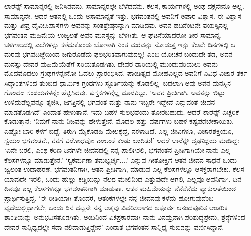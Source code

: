 ಲಾರೆನ್ಸ್ ಸಾಮಾನ್ಯರಲ್ಲಿ ಜನಿಸಿದವನು. ಸಾಮಾನ್ಯರಲ್ಲೇ ಬೆಳೆದವನು. ಕೆಲಸ, ಕಾರ್ಯಗಳಲ್ಲಿ ಅಂಥ ದಕ್ಷನೇನೂ ಅಲ್ಲ. ಸಾಮಾನ್ಯನೇ. ಆದರೆ ಆತನಲ್ಲಿ ಒಂದು ಅಸಾಮಾನ್ಯತೆ ಇತ್ತು. ಭಗವಂತನಲ್ಲಿ ಅವನಿಗೆ ಅಪಾರ ವಿಶ್ವಾಸ. ಈ ವಿಶ್ವಾಸ ಮತ್ತು ತೀವ್ರ ದೈವೀಪಿಪಾಸೆಗಳು ಅವನನ್ನು ಸಂತಶ್ರೇಷ್ಠನನ್ನಾಗಿ ಮಾಡಿದವು. ಅವನ ಹದಿನೆಂಟನೇ ವಯಸ್ಸಿನಲ್ಲಿ ಭಗವಂತನ ಮಹಿಮೆಯ ಉಜ್ವಲತೆ ಅವನ ಮನಸ್ಸನ್ನು ಬೆಳಗಿತು. ಆ ಘಟನೆಯಾದರೋ ತೀರ ಸಾಮಾನ್ಯ. ಚಳಿಗಾಲದಲ್ಲಿ ಎಲೆಗಳನ್ನು ಕಳೆದುಕೊಂಡು ಬೋಳಾಗಿ ನಿಂತ ಮರವನ್ನು ನೋಡುತ್ತ ಇನ್ನು ಕೆಲವೇ ದಿನಗಳಲ್ಲಿ ಆ ಮರವು ಭಗವದಿಚ್ಛೆಯಿಂದ ಚಿಗುರೊಡೆದು ಫಲಭರಿತವಾಗುವುದಲ್ಲ! ಎಂಬ ಯೋಚನೆ ಬಂದುದೇ ತಡ, ಅವನ ಮನಸ್ಸು ದೇವರ ಮಹಿಮೆಯೆಡೆಗೆ ಸರಿಯತೊಡಗಿತು. ದೇವರ ದಾರಿಯಲ್ಲಿ ಮುಂದುವರಿಯಲು ಅವನು ಮೊದಮೊದಲು ಗ್ರಂಥಗಳನ್ನೇನೋ ಓದಲು ಪ್ರಾರಂಭಿಸಿದ. ಪಾಂಡಿತ್ಯದ ಮೋಹವಿಲ್ಲದ ಅವನಿಗೆ ವಿವಿಧ ವಿಚಾರ ತರ್ಕ ಸಿದ್ಧಾಂತಗಳಿಂದ ತುಂಬಿದ ಧಾರ್ಮಿಕ ಗ್ರಂಥಗಳು ಸ್ಫೂರ್ತಿಯನ್ನು ಕೊಡಲಿಲ್ಲ. ಬದಲಾಗಿ ಅವು ಅವನ ಮನಸ್ಸಿನ ಗೊಂದಲ ಸಂಶಯಗಳನ್ನೇ ಹೆಚ್ಚಿಸಿದವು. ಪುಸ್ತಕಗಳನ್ನೆಲ್ಲ ದೂರವಿಟ್ಟು, ‘ಅವನ ಪ್ರೀತಿಗಾಗಿ, ಅವನನ್ನು ಬಿಟ್ಟು ಉಳಿದುದೆಲ್ಲವನ್ನೂ ತ್ಯಜಿಸಿ, ಜಗತ್ತಿನಲ್ಲಿ ಭಗವಂತ ಮತ್ತು ನಾನು ಇಬ್ಬರೇ ಇದ್ದೇವೆ ಎನ್ನುವಂತೆ ಜೀವನ ಮಾಡತೊಡಗಿದೆ’ ಎಂದಾತ ಹೇಳುತ್ತಾನೆ. ಇದು ಬಹಳ ಸುಲಭವೆಂದು ತೋರಬಹುದು. ಆದರೆ ಲಾರೆನ್ಸ್ ಎಚ್ಚರಿಕೆ ಕೊಡುತ್ತಾನೆ: ‘ನಿಮಗೆ ನಾನು ನಿಜವನ್ನು ಹೇಳುತ್ತೇನೆ. ಮೊದಲ ಹತ್ತು ವರ್ಷಗಳು ಬಹಳ ಕಷ್ಟಪಡಬೇಕಾಯಿತು. ಎಷ್ಟೋ ಬಾರಿ ಕೆಳಗೆ ಬಿದ್ದೆ. ತಿರುಗಿ ಮೈಕೊಡಹಿ ಮೇಲಕ್ಕೆದ್ದೆ, ನರಳಾಡಿದೆ. ಎಲ್ಲ ಜೀವಿಗಳೂ, ವಿಚಾರಶಕ್ತಿಯೂ, ಸ್ವಯಂ ಭಗವಂತನೇ, ನನಗೆ ವಿರೋಧವೋ ಎಂಬಂತೆ ಕಂಡು ಬಂದಿತು!’ ಆದರೆ ಲಾರೆನ್ಸ್ ದೃಢನಿಶ್ಚಯ ಮಾಡಿದ್ದ: ‘ಏನೇ ಬರಲಿ, ಎಂಥ ಕಠಿಣ ದಿನಗಳೇ ಜೀವನದಲ್ಲಿ ನನ್ನ ಪಾಲಿಗಿರಲಿ, ಭಗವಂತನ ಪ್ರೀತಿಗಾಗಿಯೇ ನಾನು ಎಲ್ಲ ಕೆಲಸಗಳನ್ನೂ ಮಾಡುತ್ತೇನೆ.’ ‘ಸ್ವಕರ್ಮಣಾ ತಮಭ್ಯರ್ಚ್ಯ....’ ಎನ್ನುವ ಗೀತೋಕ್ತಿಗೆ ಆತನ ಜೀವನ-ಸಾಧನೆ ಒಂದು ಜ್ವಲಂತ ಉದಾಹರಣೆ. ಭಗವಂತನಿಗಾಗಿ, ಆತನ ಪ್ರೀತಿಗಾಗಿ, ಮಾಡುವ ಎಲ್ಲ ಕೆಲಸಗಳಲ್ಲೂ ಆಸಕ್ತರಾಗಬೇಕು. ಕೆಲಸ ಯಾವುದೇ ಇರಲಿ, ಒಂದು ಹುಲ್ಲು ಕಡ್ಡಿಯನ್ನು ನೆಲದ ಮೇಲಿನಿಂದ ಎತ್ತುವುದೇ ಆಗಲಿ, ಎಲ್ಲವೂ ಅವನಿಗಾಗಿ. ದಿನ ದಿನವೂ ಎಲ್ಲ ಕೆಲಸಗಳನ್ನೂ ಭಗವಂತನಿಗಾಗಿ ಮಾಡುತ್ತಾ, ಆತನ ಮಹಿಮೆಯನ್ನು ನೆನೆನೆನೆದು ವ್ಯಾಕುಲತೆಯಿಂದ ಪ್ರಾರ್ಥಿಸುತ್ತಿದ್ದ. ‘ಈ ರೀತಿಯಾಗಿ ತೊಂದರೆ, ಆತಂಕಗಳಲ್ಲೇ ನನ್ನ ಜೀವನವು ಕಳೆದು ಹೋಗುವುದೆಂಬ ವ್ಯಥೆಯಲ್ಲಿದ್ದಾಗಲೇ, ಒಂದು ದಿನ ಥಟ್ಟನೇ ನನ್ನ ಆತ್ಮವು ವಿವರಿಸಲಾಗದ ಅಪೂರ್ವ ಆನಂದಪೂರಿತ ಆಂತರಿಕ ಶಾಂತಿಯನ್ನು ಅನುಭವಿಸತೊಡಗಿತು. ಅಂದಿನಿಂದ ಏಕಪ್ರಕಾರವಾಗಿ ನಾನು ವಿನಮ್ರನಾಗಿ ಪರಿಶುದ್ಧಪ್ರೇಮ, ಶ್ರದ್ಧೆಗಳಿಂದ ದೇವರ ಸಾನ್ನಿಧ್ಯದಲ್ಲೇ ಸದಾ ನಲಿದಾಡುತ್ತಿದ್ದೇನೆ’ ಎಂದಾತ ಭಗವಂತನ ಸಾನ್ನಿಧ್ಯ ಸುಖವನ್ನು ವರ್ಣಿಸಿದ್ದಾನೆ.

